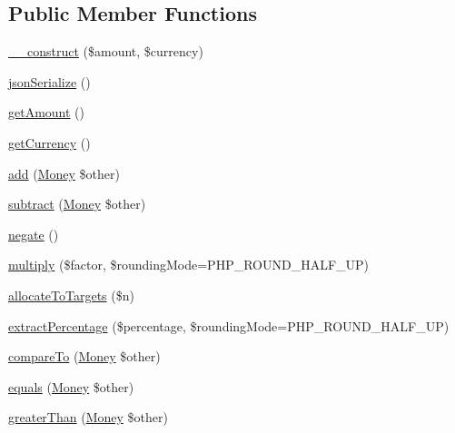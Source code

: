 \subsection*{Public Member Functions}
\begin{DoxyCompactItemize}
\item 
\hyperlink{classSebastianBergmann_1_1Money_1_1Money_a3f04a6e943e160cf11c34db2ace48010}{\+\_\+\+\_\+construct} (\$amount, \$currency)
\item 
\hyperlink{classSebastianBergmann_1_1Money_1_1Money_a458d28890e8d2d7bdf47ea481ac9e639}{json\+Serialize} ()
\item 
\hyperlink{classSebastianBergmann_1_1Money_1_1Money_ac33d55e50ba92bd98aa213315d1af201}{get\+Amount} ()
\item 
\hyperlink{classSebastianBergmann_1_1Money_1_1Money_a27f9a4041099ab7f65f81865e7adb4c9}{get\+Currency} ()
\item 
\hyperlink{classSebastianBergmann_1_1Money_1_1Money_a9b66787411ddea8330614ba621588740}{add} (\hyperlink{classSebastianBergmann_1_1Money_1_1Money}{Money} \$other)
\item 
\hyperlink{classSebastianBergmann_1_1Money_1_1Money_add1e9a81b23e648560cf265cedbd4600}{subtract} (\hyperlink{classSebastianBergmann_1_1Money_1_1Money}{Money} \$other)
\item 
\hyperlink{classSebastianBergmann_1_1Money_1_1Money_ae33f2e70c564a2eb62a58f92192e51bc}{negate} ()
\item 
\hyperlink{classSebastianBergmann_1_1Money_1_1Money_a9d1710f6bf5ef8170bb6a8185032f0b9}{multiply} (\$factor, \$rounding\+Mode=P\+H\+P\+\_\+\+R\+O\+U\+N\+D\+\_\+\+H\+A\+L\+F\+\_\+\+U\+P)
\item 
\hyperlink{classSebastianBergmann_1_1Money_1_1Money_a8310fe689adbea74cd0c2183827ff691}{allocate\+To\+Targets} (\$n)
\item 
\hyperlink{classSebastianBergmann_1_1Money_1_1Money_a6c7551fd271f031e54be8499bfdf745c}{extract\+Percentage} (\$percentage, \$rounding\+Mode=P\+H\+P\+\_\+\+R\+O\+U\+N\+D\+\_\+\+H\+A\+L\+F\+\_\+\+U\+P)
\item 
\hyperlink{classSebastianBergmann_1_1Money_1_1Money_a00ef3fcca0a99e3bc9e027e994884db7}{compare\+To} (\hyperlink{classSebastianBergmann_1_1Money_1_1Money}{Money} \$other)
\item 
\hyperlink{classSebastianBergmann_1_1Money_1_1Money_a93fc402915121bb3e1bd1db9ce83be5c}{equals} (\hyperlink{classSebastianBergmann_1_1Money_1_1Money}{Money} \$other)
\item 
\hyperlink{classSebastianBergmann_1_1Money_1_1Money_ac6c6eb9c4e30fc7528d0d9dbdf6cae7e}{greater\+Than} (\hyperlink{classSebastianBergmann_1_1Money_1_1Money}{Money} \$other)

\end{DoxyCompactItemize}
